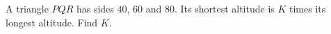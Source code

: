 A triangle $PQR$ has sides $40$, $60$ and $80$. Its shortest altitude is $K$ times its longest altitude. Find $K$.
